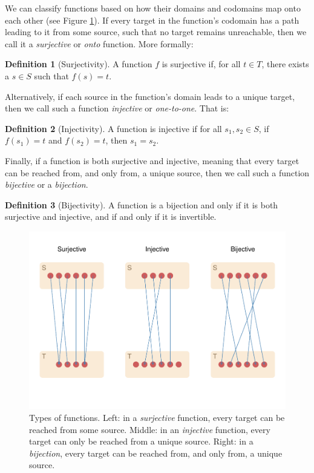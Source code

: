 \documentclass[
]{book}
\theoremstyle{definition}
\newtheorem{definition}{Definition}[chapter]
\theoremstyle{definition}
\theoremstyle{definition}
\theoremstyle{definition}
\theoremstyle{remark}
\begin{document}
We can classify functions based on how their domains and codomains map onto each other (see Figure \ref{fig:function-types}). If every target in the function's codomain has a path leading to it from some source, such that no target remains unreachable, then we call it a \emph{surjective} or \emph{onto} function. More formally:

\begin{definition}[Surjectivity]
A function \(f\) is surjective if, for all \(t \in T\), there exists a \(s \in S\) such that \(f(s) = t\).
\end{definition}

Alternatively, if each source in the function's domain leads to a unique target, then we call such a function \emph{injective} or \emph{one-to-one}. That is:

\begin{definition}[Injectivity]
A function is injective if for all \(s_1, s_2 \in S\), if \(f(s_1) = t\) and \(f(s_2) = t\), then \(s_1 = s_2\).
\end{definition}

Finally, if a function is both surjective and injective, meaning that every target can be reached from, and only from, a unique source, then we call such a function \emph{bijective} or a \emph{bijection}.

\begin{definition}[Bijectivity]
A function is a bijection and only if it is both surjective and injective, and if and only if it is invertible.
\end{definition}

\begin{figure}
\centering
\includegraphics{_main_files/figure-latex/function-types-1.pdf}
\caption{\label{fig:function-types}Types of functions. Left: in a \emph{surjective} function, every target can be reached from some source. Middle: in an \emph{injective} function, every target can only be reached from a unique source. Right: in a \emph{bijection}, every target can be reached from, and only from, a unique source.}
\end{figure}
\end{document}
